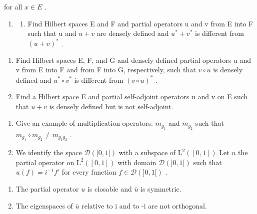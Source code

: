 for all \(x \in E\) .

\begin{enumerate}
\def\labelenumi{\arabic{enumi})}
\setcounter{enumi}{8}
\tightlist
\item
  \begin{enumerate}
  \def\labelenumii{\alph{enumii})}
  \tightlist
  \item
    Find Hilbert spaces E and F and partial operators u and v from E into F such that u and \(u + v\) are densely defined and \(u^{*} + v^{*}\) is different from \((u + v)^{*}\) .
  \end{enumerate}
\end{enumerate}

\begin{enumerate}
\def\labelenumi{\alph{enumi})}
\setcounter{enumi}{1}
\item
  Find Hilbert spaces E, F, and G and densely defined partial operators u and v from E into F and from F into G, respectively, such that \(v \circ u\) is densely defined and \(u^{*} \circ v^{*}\) is different from \((v \circ u)^{*}\) .
\item
  Find a Hilbert space E and partial self-adjoint operators u and v on E such that \(u + v\) is densely defined but is not self-adjoint.
\end{enumerate}

\begin{enumerate}
\def\labelenumi{\arabic{enumi})}
\setcounter{enumi}{9}
\item
  Give an example of multiplication operators. \(m_{g_{1}}\) and \(m_{g_{2}}\) such that \(m_{g_{1}} \circ m_{g_{2}} \neq m_{g_{1}g_{2}}\) .
\item
  We identify the space \(\mathcal{D}(]0,1[)\) with a subspace of \(\mathrm{L}^2 ([0,1])\) Let \(u\) the partial operator on \(\mathrm{L}^2 ([0,1])\) with domain \(\mathcal{D}(]0,1[)\) such that \(u(f) = i^{-1}f'\) for every function \(f \in \mathcal{D}(]0,1[)\) .
\end{enumerate}

\begin{enumerate}
\def\labelenumi{\alph{enumi})}
\item
  The partial operator \(u\) is closable and \(\overline{u}\) is symmetric.
\item
  The eigenspaces of \(\overline{u}\) relative to i and to -i are not orthogonal.
\end{enumerate}

